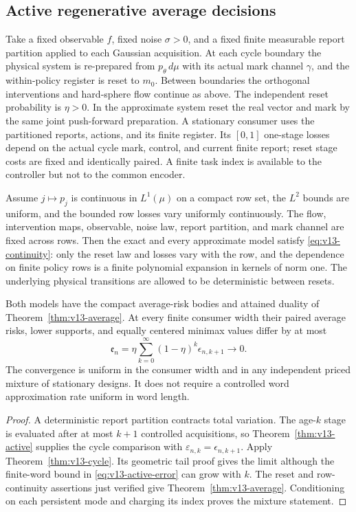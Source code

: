\subsection{Active regenerative average decisions}
Take a fixed observable $f$, fixed noise $\sigma>0$, and a fixed finite
measurable report partition applied to each Gaussian acquisition.
At each cycle boundary the physical system is re-prepared from
$p_\theta\,d\mu$ with its actual mark channel $\gamma$, and the
within-policy register is reset to $m_0$. Between boundaries the
orthogonal interventions and hard-sphere flow continue as above. The
independent reset probability is $\eta>0$. In the approximate system
reset the real vector and mark by the same joint push-forward
preparation. A stationary consumer uses the partitioned reports,
actions, and its finite register. Its $[0,1]$ one-stage losses depend
on the actual cycle mark, control, and current finite report; reset
stage costs are fixed and identically paired. A finite task index is
available to the controller but not to the common encoder.

Assume $j\mapsto p_j$ is continuous in $L^1(\mu)$ on a compact row
set, the $L^2$ bounds are uniform, and the bounded row losses vary
uniformly continuously. The flow, intervention maps, observable,
noise law, report partition, and mark channel are fixed across rows.
Then the exact and every approximate model satisfy
\eqref{eq:v13-continuity}: only the reset law and losses vary with the
row, and the dependence on finite policy rows is a finite polynomial
expansion in kernels of norm one. The underlying physical transitions
are allowed to be deterministic between resets.

\begin{corollary}\label{cor:v13-active-average}
Both models have the compact average-risk bodies and attained duality
of Theorem~\ref{thm:v13-average}. At every finite consumer width their
paired average risks, lower supports, and equally centered minimax
values differ by at most
\begin{equation}\label{eq:v13-active-average}
 \mathfrak e_n=\eta\sum_{k=0}^\infty
                    (1-\eta)^k\epsilon_{n,k+1}\longrightarrow0.
\end{equation}
The convergence is uniform in the consumer width and in any independent
priced mixture of stationary designs. It does not require a controlled
word approximation rate uniform in word length.
\end{corollary}
\begin{proof}
A deterministic report partition contracts total variation.
The age-$k$ stage is evaluated after at most $k+1$ controlled
acquisitions, so Theorem~\ref{thm:v13-active} supplies the cycle
comparison with $\varepsilon_{n,k}=\epsilon_{n,k+1}$. Apply
Theorem~\ref{thm:v13-cycle}. Its geometric tail proof gives the limit
although the finite-word bound in \eqref{eq:v13-active-error} can grow
with $k$. The reset and row-continuity assertions just verified give
Theorem~\ref{thm:v13-average}. Conditioning on each persistent mode
and charging its index proves the mixture statement.
\end{proof}

